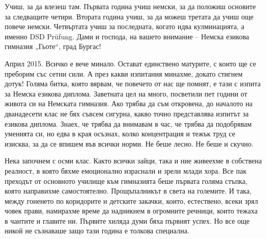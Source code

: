 \begin{multicols}{3}

Учиш, за да влезеш там. Първата година учиш немски, за да положиш основите за 
следващите четири. Втората година учиш, за да можеш третата да учиш още повече 
немски. Четвъртата учиш за последната, когато идва кулминацията, а именно  DSD 
Prüfung. Дами и господа, на вашето внимание – Немска езикова гимназия „Гьоте“, 
град Бургас!

Април 2015. Всичко е вече минало. Остават единствено матурите, с които ще се 
преборим със сетни сили. А през какви изпитания минахме, докато стигнем дотук! 
Голяма битка, която вярвам, че повечето от нас ще помнят, е тази с изпита за 
Немска езикова диплома. Заветната цел на много, посветили пет години от живота 
си на Немската гимназия. Ако трябва да съм  откровена, до началото на 
дванадесети клас не бях съвсем сигурна,  какво точно представлява изпитът за 
езикова диплома. Знаех, че трябва да внимавам в час, че трябва да подобрявам 
уменията си, но едва в края осъзнах, колко концентрация и тежък труд се изисква, 
за да се впишем във всички норми. Не беше лесно. Не беше и скучно. 

Нека започнем с осми клас. Както всички зайци, така и ние живеехме в собствена 
реалност, в която бяхме емоционално израснали и зрели млади хора. Все пак 
преходът от основното училище към гимназията беше първата голяма стъпка, която 
направихме самостоятелно. Прощъпалникът в света на големите. И така, между 
гоненето по коридорите и детските закачки, които, естествено, всеки зрял човек 
прави, намирахме време да надникнем в огромните речници, които тежаха в чантите 
и главите ни. Първите хиляда думи бяха първият успех. Но все още никой не 
съзнаваше защо тази година е толкова специална.


\end{multicols}

